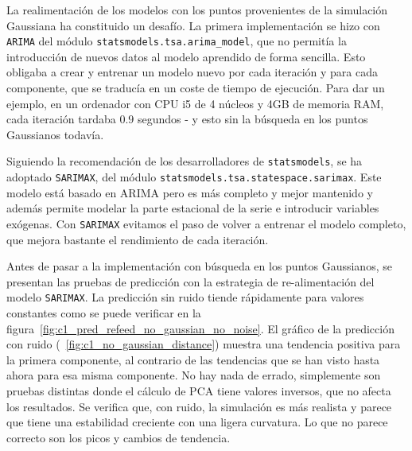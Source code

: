 \documentclass[11pt,spanish,listoffigures,listoftables]{tfgetsinf}
\begin{document}
	La realimentación de los modelos con los puntos provenientes de la simulación Gaussiana ha constituido un desafío. La primera implementación se hizo con {\tt ARIMA} del módulo {\tt statsmodels.tsa.arima\_model}, que no permitía la introducción de nuevos datos al modelo aprendido de forma sencilla. Esto obligaba a crear y entrenar un modelo nuevo por cada iteración y para cada componente, que se traducía en un coste de tiempo de ejecución. Para dar un ejemplo, en un ordenador con CPU i5 de 4 núcleos y 4GB de memoria RAM, cada iteración tardaba \(0.9\) segundos - y esto sin la búsqueda en los puntos Gaussianos todavía.
	
	Siguiendo la recomendación de los desarrolladores de {\tt statsmodels}, se ha adoptado {\tt SARIMAX}, del módulo {\tt statsmodels.tsa.statespace.sarimax}. Este modelo está basado en ARIMA pero es más completo y mejor mantenido y además permite modelar la parte estacional de la serie e introducir variables exógenas. Con {\tt SARIMAX} evitamos el paso de volver a entrenar el modelo completo, que mejora bastante el rendimiento de cada iteración.
	
	Antes de pasar a la implementación con búsqueda en los puntos Gaussianos, se presentan las pruebas de predicción con la estrategia de re-alimentación del modelo {\tt SARIMAX}. La predicción sin ruido tiende rápidamente para valores constantes como se puede verificar en la figura~\ref{fig:c1_pred_refeed_no_gaussian_no_noise}. El gráfico de la predicción con ruido (~\ref{fig:c1_no_gaussian_distance}) muestra una tendencia positiva para la primera componente, al contrario de las tendencias que se han visto hasta ahora para esa misma componente. No hay nada de errado, simplemente son pruebas distintas donde el cálculo de PCA tiene valores inversos, que no afecta los resultados. Se verifica que, con ruido, la simulación es más realista y parece que tiene una estabilidad creciente con una ligera curvatura. Lo que no parece correcto son los picos y cambios de tendencia.
	
\end{document}
